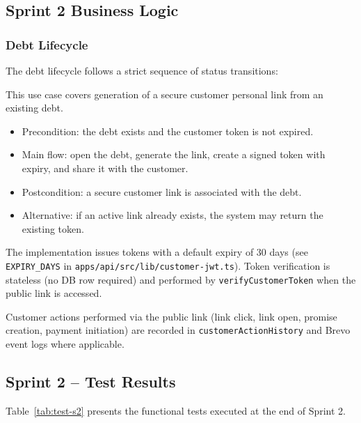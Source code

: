 ﻿\documentclass[12pt,a4paper]{report}
\begin{document}
\subsection{Sprint 2 Business Logic}

\subsubsection{Debt Lifecycle}

The debt lifecycle follows a strict sequence of status transitions:

\noindent This use case covers generation of a secure customer personal link from an existing debt.

\begin{itemize}
  \item Precondition: the debt exists and the customer token is not expired.
  \item Main flow: open the debt, generate the link, create a signed token with expiry, and share it with the customer.
  \item Postcondition: a secure customer link is associated with the debt.
  \item Alternative: if an active link already exists, the system may return the existing token.
\end{itemize}
The implementation issues tokens with a default expiry of 30 days (see
\texttt{EXPIRY\_DAYS} in \texttt{apps/api/src/lib/customer-jwt.ts}). Token verification is
stateless (no DB row required) and performed by \texttt{verifyCustomerToken} when the
public link is accessed.

Customer actions performed via the public link (link click, link open, promise
creation, payment initiation) are recorded in \texttt{customerActionHistory} and Brevo
event logs where applicable.

\subsection{Sprint 2 -- Test Results}

Table~\ref{tab:test-s2} presents the functional tests executed at the end of Sprint 2.
\end{document}
